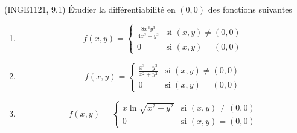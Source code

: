 
\begin{exercice}\label{exoFoncDeuxVar0019}

	(INGE1121, 9.1) Étudier la différentiabilité en $(0,0)$ des fonctions suivantes
	\begin{enumerate}

		\item
			\begin{equation}
				f(x,y)=\begin{cases}
					\frac{ 8x^3y^3 }{ 4x^2+y^2 }	&	\text{si }(x,y)\neq (0,0)\\
					0	&	 \text{si }(x,y)=(0,0)
				\end{cases}
			\end{equation}
		\item
			\begin{equation}
				f(x,y)=\begin{cases}
					\frac{ x^3-y^3 }{ x^2+y^2 }	&	\text{si }(x,y)\neq (0,0)\\
					0	&	 \text{si }(x,y)=(0,0)
				\end{cases}
			\end{equation}
			
		\item
			\begin{equation}
				f(x,y)=\begin{cases}
					x\ln\sqrt{x^2+y^2}	&	\text{si }(x,y)\neq (0,0)\\
					0	&	 \text{si }(x,y)=(0,0)
				\end{cases}
			\end{equation}

	\end{enumerate}

\end{exercice}
